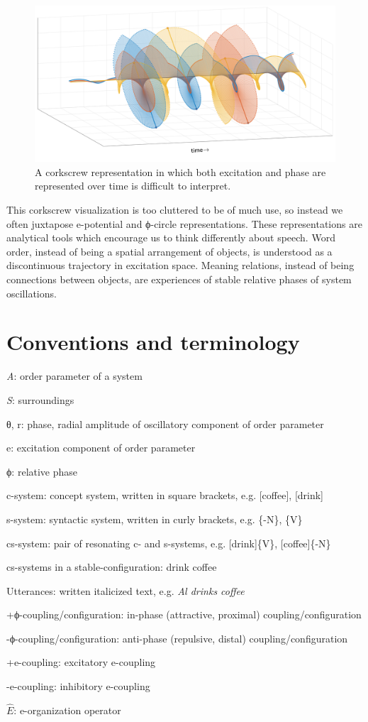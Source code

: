   
\begin{figure}
\includegraphics[width=\textwidth]{figures/Tilsen-img28.png}
\caption{A corkscrew representation in which both excitation and phase are represented over time is difficult to interpret.}
\label{fig:2:21}
\end{figure}
 

  This corkscrew visualization is too cluttered to be of much use, so instead we often juxtapose e-potential and ϕ{}-circle representations. These representations are analytical tools which encourage us to think differently about speech. Word order, instead of being a spatial arrangement of objects, is understood as a discontinuous trajectory in excitation space. Meaning relations, instead of being connections between objects, are experiences of stable relative phases of system oscillations.

\section{Conventions and terminology}

\textit{A}: order parameter of a system

\noindent \textit{S}: surroundings

\noindent θ, r: phase, radial amplitude of oscillatory component of order parameter

\noindent e: excitation component of order parameter

\noindent ϕ: relative phase

\noindent c-system: concept system, written in square brackets, e.g. [coffee], [drink]

\noindent s-system: syntactic system, written in curly brackets, e.g. \{-N\}, \{V\}

\noindent cs-system: pair of resonating c- and s-systems, e.g. [drink]\{V\}, [coffee]\{-N\}

\noindent cs-systems in a stable-configuration: {\textbar}drink coffee{\textbar}

\noindent Utterances: written italicized text, e.g. \textit{Al drinks coffee}

\noindent +ϕ-coupling/configuration: in-phase (attractive, proximal) coupling/configuration

\noindent {}-ϕ-coupling/configuration: anti-phase (repulsive, distal) coupling/configuration

\noindent +e-coupling: excitatory e-coupling

\noindent {}-e-coupling: inhibitory e-coupling

\noindent $\widehat {{E}}$: e-organization operator
